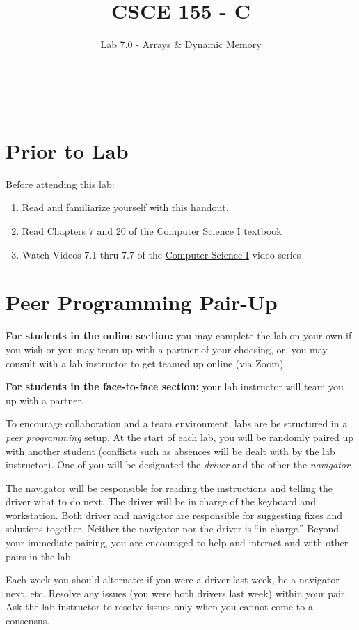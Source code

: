 \documentclass[12pt]{scrartcl}
\title{CSCE 155 - C}
\subtitle{Lab 7.0 - Arrays \& Dynamic Memory}
\author{~}
\date{~}
\begin{document}
\maketitle

\section*{Prior to Lab}

Before attending this lab:
\begin{enumerate}
  \item Read and familiarize yourself with this handout.
  \item Read Chapters 7 and 20 of the \href{http://cse.unl.edu/~cbourke/ComputerScienceOne.pdf}{Computer Science I} textbook
  \item Watch Videos 7.1 thru 7.7 of the \href{https://www.youtube.com/playlist?list=PL4IH6CVPpTZVkiEnCEOdGbYsFEdtKc5Bx}{Computer Science I} video series
\end{enumerate}

\section*{Peer Programming Pair-Up}

\textbf{For students in the online section:} you may complete
the lab on your own if you wish or you may team up with a partner
of your choosing, or, you may consult with a lab instructor to get
teamed up online (via Zoom).

\textbf{For students in the face-to-face section:} your
lab instructor will team you up with a partner.  

To encourage collaboration and a team environment, labs are be
structured in a \emph{peer programming} setup.  At the start of
each lab, you will be randomly paired up with another student 
(conflicts such as absences will be dealt with by the lab instructor).
One of you will be designated the \emph{driver} and the other
the \emph{navigator}.  

The navigator will be responsible for reading the instructions and
telling the driver what to do next.  The driver will be in charge of the
keyboard and workstation.  Both driver and navigator are responsible
for suggesting fixes and solutions together.  Neither the navigator
nor the driver is ``in charge.''  Beyond your immediate pairing, you
are encouraged to help and interact and with other pairs in the lab.

Each week you should alternate: if you were a driver last week, 
be a navigator next, etc.  Resolve any issues (you were both drivers
last week) within your pair.  Ask the lab instructor to resolve issues
only when you cannot come to a consensus.  
\end{document}
